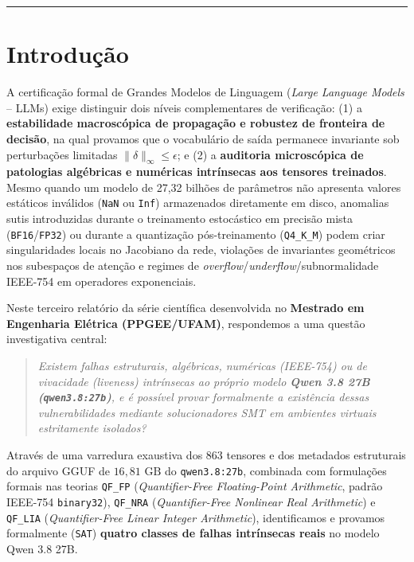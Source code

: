 \documentclass[11pt,a4paper]{article}
\theoremstyle{definition}
\begin{document}
\newpage
\tableofcontents
\vspace{0.4cm}
\hrule
\vspace{0.4cm}

\section{Introdução}

A certificação formal de Grandes Modelos de Linguagem (\textit{Large Language Models} -- LLMs) exige distinguir dois níveis complementares de verificação: (1) a \textbf{estabilidade macroscópica de propagação e robustez de fronteira de decisão}, na qual provamos que o vocabulário de saída permanece invariante sob perturbações limitadas $\|\delta\|_\infty \le \epsilon$; e (2) a \textbf{auditoria microscópica de patologias algébricas e numéricas intrínsecas aos tensores treinados}. Mesmo quando um modelo de 27,32 bilhões de parâmetros não apresenta valores estáticos inválidos (\texttt{NaN} ou \texttt{Inf}) armazenados diretamente em disco, anomalias sutis introduzidas durante o treinamento estocástico em precisão mista (\texttt{BF16}/\texttt{FP32}) ou durante a quantização pós-treinamento (\texttt{Q4\_K\_M}) podem criar singularidades locais no Jacobiano da rede, violações de invariantes geométricos nos subespaços de atenção e regimes de \textit{overflow}/\textit{underflow}/subnormalidade IEEE-754 em operadores exponenciais.

Neste terceiro relatório da série científica desenvolvida no \textbf{Mestrado em Engenharia Elétrica (PPGEE/UFAM)}, respondemos a uma questão investigativa central:
\begin{quote}
\textit{Existem falhas estruturais, algébricas, numéricas (IEEE-754) ou de vivacidade (liveness) intrínsecas ao próprio modelo \textbf{Qwen 3.8 27B (\texttt{qwen3.8:27b})}, e é possível provar formalmente a existência dessas vulnerabilidades mediante solucionadores SMT em ambientes virtuais estritamente isolados?}
\end{quote}

Através de uma varredura exaustiva dos 863 tensores e dos metadados estruturais do arquivo GGUF de $16{,}81\text{ GB}$ do \texttt{qwen3.8:27b}, combinada com formulações formais nas teorias \texttt{QF\_FP} (\textit{Quantifier-Free Floating-Point Arithmetic}, padrão IEEE-754 \texttt{binary32}), \texttt{QF\_NRA} (\textit{Quantifier-Free Nonlinear Real Arithmetic}) e \texttt{QF\_LIA} (\textit{Quantifier-Free Linear Integer Arithmetic}), identificamos e provamos formalmente (\texttt{SAT}) \textbf{quatro classes de falhas intrínsecas reais} no modelo Qwen 3.8 27B.
\end{document}
